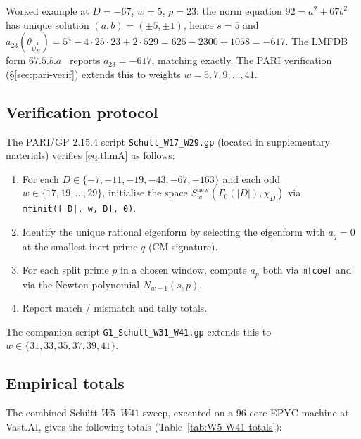\documentclass[11pt,a4paper]{amsart}
\theoremstyle{definition}
\begin{document}
Worked example at $D = -67$, $w = 5$, $p = 23$: the norm equation $92 = a^2 + 67 b^2$ has unique solution $(a, b) = (\pm 5, \pm 1)$, hence $s = 5$ and $a_{23}(\theta_{\bar\psi_K^4}) = 5^4 - 4 \cdot 25 \cdot 23 + 2 \cdot 529 = 625 - 2300 + 1058 = -617$. The LMFDB form $67.5.b.a$~\cite{LMFDB} reports $a_{23} = -617$, matching exactly. The PARI verification (\S\ref{sec:pari-verif}) extends this to weights $w = 5, 7, 9, \ldots, 41$.

\subsection{Verification protocol}\label{sec:thmA-verif}

The PARI/GP 2.15.4 script \texttt{Schutt\_W17\_W29.gp} (located in supplementary materials) verifies \eqref{eq:thmA} as follows:
\begin{enumerate}[leftmargin=2em]
  \item For each $D \in \{-7, -11, -19, -43, -67, -163\}$ and each odd $w \in \{17, 19, \ldots, 29\}$, initialise the space $S_w^{\mathrm{new}}(\Gamma_0(|D|), \chi_D)$ via \texttt{mfinit([|D|, w, D], 0)}.
  \item Identify the unique rational eigenform by selecting the eigenform with $a_q = 0$ at the smallest inert prime $q$ (CM signature).
  \item For each split prime $p$ in a chosen window, compute $a_p$ both via \texttt{mfcoef} and via the Newton polynomial $N_{w-1}(s, p)$.
  \item Report match / mismatch and tally totals.
\end{enumerate}

The companion script \texttt{G1\_Schutt\_W31\_W41.gp} extends this to $w \in \{31, 33, 35, 37, 39, 41\}$.

\subsection{Empirical totals}\label{sec:thmA-totals}

The combined Sch\"utt $W5$--$W41$ sweep, executed on a 96-core EPYC machine at Vast.AI, gives the following totals (Table~\ref{tab:W5-W41-totals}):
\end{document}
